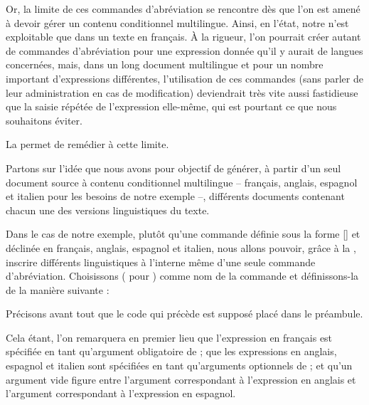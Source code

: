 \documentclass{article}
\begin{document}
Or, la limite de ces commandes d'abréviation se rencontre dès que l'on est amené à devoir gérer un contenu conditionnel multilingue. Ainsi, en l'état, notre  n'est exploitable que dans un texte en français. À la rigueur, l'on pourrait créer autant de commandes d'abréviation pour une expression donnée qu'il y aurait de langues concernées, mais, dans un long document multilingue et pour un nombre important d'expressions différentes, l'utilisation de ces commandes (sans parler de leur administration en cas de modification) deviendrait très vite aussi fastidieuse que la saisie répétée de l'expression elle-même, qui est pourtant ce que nous souhaitons éviter.

La  permet de remédier à cette limite.

\tutostep
Partons sur l'idée que nous avons pour objectif de générer, à partir d'un seul document source à contenu conditionnel multilingue -- français, anglais, espagnol et italien pour les besoins de notre exemple --, différents documents contenant chacun une des versions linguistiques du texte.

Dans le cas de notre exemple, plutôt qu'une commande définie sous la forme [\argmvoid{}] et déclinée en français, anglais, espagnol et italien, nous allons pouvoir, grâce à la , inscrire différents  linguistiques à l'interne même d'une seule commande d'abréviation. Choisissons  ( pour ) comme nom de la commande et définissons-la de la manière suivante :

\begin{codeblock}
    \begin{subcodeblock}
    \codestm{\argovoid{}}
    \end{subcodeblock}
\end{codeblock}

Précisons avant tout que le code qui précède est supposé placé dans le préambule.

Cela étant, l'on remarquera en premier lieu que l'expression en français est spécifiée en tant qu'argument obligatoire de  ; que les expressions en anglais, espagnol et italien sont spécifiées en tant qu'arguments optionnels de  ; et qu'un argument vide figure entre l'argument correspondant à l'expression en anglais et l'argument correspondant à l'expression en espagnol.
\end{document}
